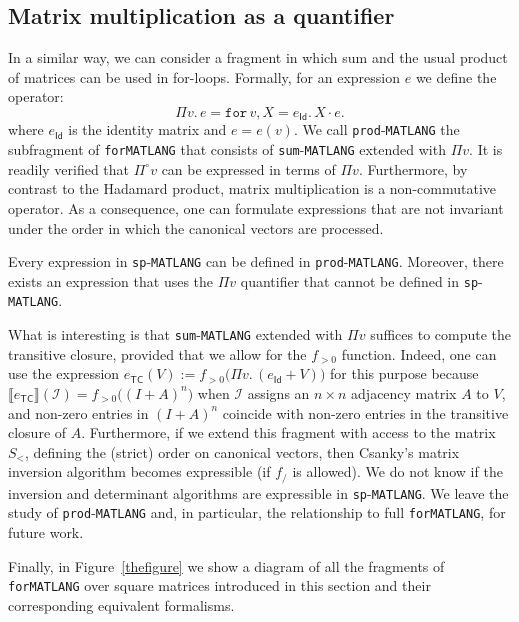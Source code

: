 \documentclass[sigconf]{acmart}
\newcommand{\sprod}{\Pi}
\newcommand{\sem}[2]{\llbracket #1 \rrbracket(#2)}
\newcommand{\I}{\mathcal{I}}
\newcommand{\langfor}{\texttt{for}\text{-}\texttt{MATLANG}\xspace}
\newcommand{\langsum}{\texttt{sum}-\texttt{MATLANG}\xspace}
\newcommand{\langprod}{\texttt{sp}-\texttt{MATLANG}\xspace}
\newcommand{\langmprod}{\texttt{prod}-\texttt{MATLANG}\xspace}
\newcommand{\ffor}[3]{\texttt{for}\, #1,#2 \texttt{.}\, #3}
\newcommand{\hadprod}{\circ}
\newcommand{\qhadprod}{\Pi^{\hadprod}}
\begin{document}
\subsection{Matrix multiplication as a quantifier}\label{subsec:langlinear}
In a similar way, we can consider a fragment in which sum and the usual product of matrices can be used
in for-loops. Formally, for an expression $e$ we define the operator:
$$
\sprod v.\,  e=\ffor {v}{X = e_{\mathsf{Id}}}{X\cdot e}.
$$
where $e_{\mathsf{Id}}$ is the identity matrix and $e=e(v)$. We call \langmprod the subfragment of \langfor that consists of \langsum extended with $\sprod v$. It is readily verified that  $\qhadprod v$ can be expressed in terms of $\sprod v$.
Furthermore, by contrast to the Hadamard product, matrix multiplication is a non-commutative operator. As a consequence, one can formulate expressions that are not invariant under the order in which the canonical vectors
are processed.

\begin{proposition}
	Every expression in \langprod can be defined in \langmprod. Moreover, there exists an expression that uses the $\sprod v$ quantifier that cannot be defined in \langprod.
\end{proposition}

What is interesting is that \langsum extended with $\sprod v$ suffices to compute the transitive closure,
 provided that we allow for the $f_{>0}$ function. Indeed, one can use the expression $e_{\mathsf{TC}}(V):=f_{>0}\bigl(\sprod v.\, (e_{\mathsf{Id}}+V)\bigr)$ for this purpose because
 $\sem{e_{\mathsf{TC}}}{\I}=f_{>0}\bigl((I+A)^n\bigr)$ when $\I$ assigns an $n\times n$ adjacency matrix $A$ to $V$, and non-zero entries in $(I+A)^n$ coincide with non-zero entries in  the transitive closure of $A$.
Furthermore, if we extend this fragment with access to the matrix $S_{<}$, defining the (strict) order on canonical vectors, then Csanky's matrix inversion algorithm becomes expressible (if $f_/$ is allowed). We do not know if the inversion and determinant algorithms are expressible in \langprod.
 We leave the study of \langmprod and, in particular, the relationship to full \langfor, for future work.
 
Finally, in Figure~\ref{thefigure} we show a diagram of all the fragments of \langfor over square matrices introduced in this section and their corresponding equivalent formalisms.
\end{document}
